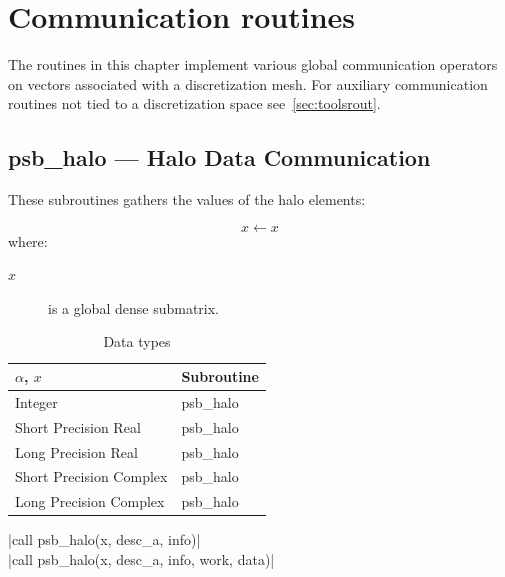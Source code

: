 \section{Communication routines}
%
%
The routines in this chapter implement various global communication operators
on vectors associated with a discretization mesh. For auxiliary communication
routines not tied to a discretization space see~\ref{sec:toolsrout}.

\clearpage\subsection{psb\_halo --- Halo Data Communication}
    

These subroutines gathers the values of the halo
elements:

\[ x \leftarrow x \]
where:
\begin{description}
\item[$x$] is a global dense  submatrix.
\end{description}

\begin{table}[h]
\begin{center}
\begin{tabular}{ll}
\hline
$\alpha$, $x$ & {\bf Subroutine}\\
\hline
Integer           & psb\_halo \\
Short Precision Real & psb\_halo \\
Long Precision Real & psb\_halo \\
Short Precision Complex & psb\_halo \\
Long Precision Complex & psb\_halo \\
\hline
\end{tabular}
\end{center}
\caption{Data types\label{tab:f90halo}}
\end{table}

\noindent\fortinline|call psb_halo(x, desc_a, info)|\\
\fortinline|call psb_halo(x, desc_a, info, work, data)|

